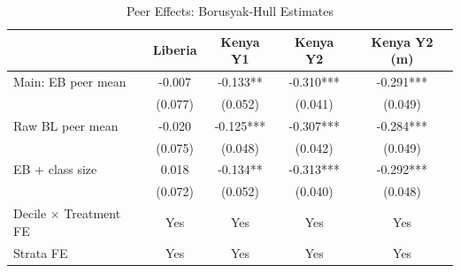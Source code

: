 \begin{table}[htbp]
\centering
\small
\caption{Peer Effects: Borusyak-Hull Estimates}
\label{tab:mechanism}
\begin{tabular}{l*{4}{c}}
\toprule
 & Liberia & Kenya Y1 & Kenya Y2 & Kenya Y2 (m) \\
\midrule
Main: EB peer mean & -0.007 & -0.133** & -0.310*** & -0.291*** \\
 & (0.077) & (0.052) & (0.041) & (0.049) \\
\addlinespace
Raw BL peer mean & -0.020 & -0.125*** & -0.307*** & -0.284*** \\
 & (0.075) & (0.048) & (0.042) & (0.049) \\
\addlinespace
EB + class size & 0.018 & -0.134** & -0.313*** & -0.292*** \\
 & (0.072) & (0.052) & (0.040) & (0.048) \\
\addlinespace
\midrule
Decile $\times$ Treatment FE & Yes & Yes & Yes & Yes \\
Strata FE & Yes & Yes & Yes & Yes \\
\bottomrule
\end{tabular}
\end{table}